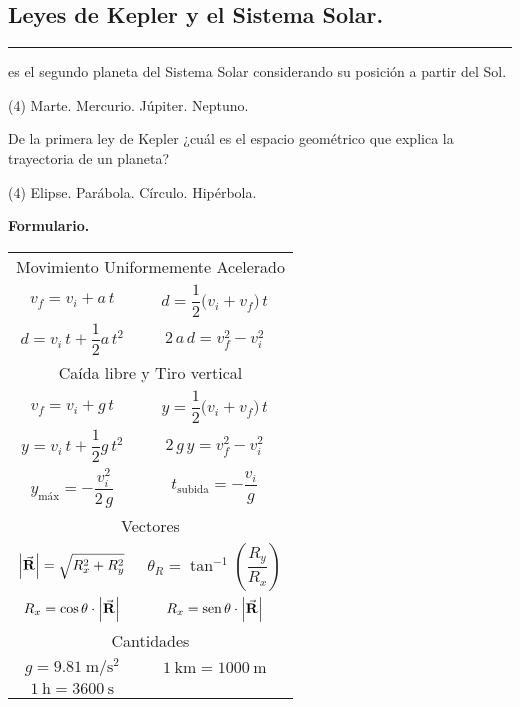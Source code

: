 \documentclass[12pt, letter]{exam}
\begin{document}
\begin{questions}
    \section{Leyes de Kepler y el Sistema Solar.}
    
    \question \rule{2cm}{0.1mm} es el segundo planeta del Sistema Solar considerando su posición a partir del Sol.
    \begin{tasks}(4)
        \task Marte.
        \task Mercurio.
        \task Júpiter.
        \task Neptuno.
    \end{tasks}
    \question De la primera ley de Kepler ¿cuál es el espacio geométrico que explica la trayectoria de un planeta?
    \begin{tasks}(4)
        \task Elipse.
        \task Parábola.
        \task Círculo.
        \task Hipérbola.
    \end{tasks}
    
\end{questions}

\newpage

\textbf{\huge{Formulario.}}
\begin{table}[H]
    \centering
    \setlength{\tabcolsep}{40pt}
    \renewcommand{\arraystretch}{2.5}
    \begin{tabular}{c  c}
        \multicolumn{2}{c}{Movimiento Uniformemente Acelerado} \\
        $v_{f} = v_{i} + a \, t$ & $d = \dfrac{1}{2} \big( v_{i} + v_{f} \big) \, t$ \\
        $d = v_{i} \, t + \dfrac{1}{2} a \, t^{2}$ & $2 \, a \, d = v_{f}^{2} - v_{i}^{2}$ \\ \hline
        \multicolumn{2}{c}{Caída libre y Tiro vertical} \\
        $v_{f} = v_{i} + g \, t$ & $y = \dfrac{1}{2} \big( v_{i} + v_{f} \big) \, t$ \\
        $y = v_{i} \, t + \dfrac{1}{2} g \, t^{2}$ & $2 \, g \, y = v_{f}^{2} - v_{i}^{2}$ \\ 
        $y_{\text{máx}} = - \dfrac{v_{i}^{2}}{2 \, g}$ & $t_{\text{subida}} = - \dfrac{v_{i}}{g}$ \\ \hline
        \multicolumn{2}{c}{Vectores} \\
        $\abs{\va{R}} = \sqrt{R_{x}^{2} + R_{y}^{2}}$ & $\theta_{R} = \tan^{-1} \left( \dfrac{R_{y}}{R_{x}} \right)$ \\
        $R_{x} = \cos \theta \cdot \abs{\va{R}}$ & $R_{x} = \text{sen} \, \theta \cdot \abs{\va{R}}$ \\ \hline
        \multicolumn{2}{c}{Cantidades} \\
        $g = \SI{9.81}{\meter\per\square\second}$ & $\SI{1}{\kilo\meter} = \SI{1000}{\meter}$  \\
        $\SI{1}{\hour} = \SI{3600}{\second}$ &
\end{tabular}
\end{table}
\end{document}
